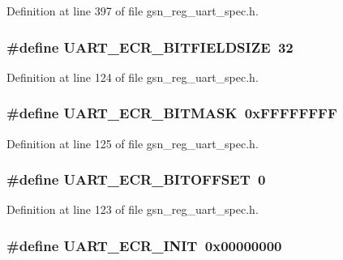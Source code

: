 Definition at line 397 of file gsn\_\-reg\_\-uart\_\-spec.h.

\hypertarget{a00575_a7e597e39646f4e823cc8bba76517b6f9}{
\subsubsection[{UART\_\-ECR\_\-BITFIELDSIZE}]{\setlength{\rightskip}{0pt plus 5cm}\#define UART\_\-ECR\_\-BITFIELDSIZE~32}}
\label{a00575_a7e597e39646f4e823cc8bba76517b6f9}


Definition at line 124 of file gsn\_\-reg\_\-uart\_\-spec.h.

\hypertarget{a00575_a6771ebc21f3c184d092d51225a3b248a}{
\subsubsection[{UART\_\-ECR\_\-BITMASK}]{\setlength{\rightskip}{0pt plus 5cm}\#define UART\_\-ECR\_\-BITMASK~0xFFFFFFFF}}
\label{a00575_a6771ebc21f3c184d092d51225a3b248a}


Definition at line 125 of file gsn\_\-reg\_\-uart\_\-spec.h.

\hypertarget{a00575_affc3cdf05a26fd7534800a4f909fbff0}{
\subsubsection[{UART\_\-ECR\_\-BITOFFSET}]{\setlength{\rightskip}{0pt plus 5cm}\#define UART\_\-ECR\_\-BITOFFSET~0}}
\label{a00575_affc3cdf05a26fd7534800a4f909fbff0}


Definition at line 123 of file gsn\_\-reg\_\-uart\_\-spec.h.

\hypertarget{a00575_a7184ccf2c6b3af3673199f409ee645e5}{
\subsubsection[{UART\_\-ECR\_\-INIT}]{\setlength{\rightskip}{0pt plus 5cm}\#define UART\_\-ECR\_\-INIT~0x00000000}}
\label{a00575_a7184ccf2c6b3af3673199f409ee645e5}


